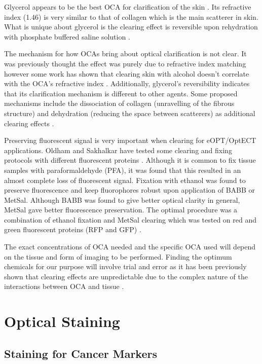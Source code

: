 	Glycerol appears to be the best OCA for clarification of the skin \cite{Vargas:1999, Wen:2009is}. Its refractive index (1.46) is very similar to that of collagen which is the main scatterer in skin. What is unique about glycerol is the clearing effect is reversible upon rehydration with phosphate buffered saline solution \cite{Vargas:1999}. 
	
	The mechanism for how OCAs bring about optical clarification is not clear. It was previously thought the effect was purely due to refractive index matching however some work has shown that clearing skin with alcohol doesn't correlate with the OCA's refractive index \cite{Choi:2005, Mao:2008}. Additionally, glycerol's reversibility indicates that its clarification mechanism is different to other agents. Some  proposed mechanisms include the dissociation of collagen (unravelling of the fibrous structure) and  dehydration (reducing the space between scatterers) as additional clearing effects \cite{Yeh:2003, Wen:2009is}.
	
	
	
	
	Preserving fluorescent signal is very important when clearing for eOPT/OptECT applications. Oldham and Sakhalkar have tested some clearing and fixing protocols with different fluorescent proteins \cite{Sakhalkar:2007hp, Oldham:2008dfa}. Although it is common to fix tissue samples with paraformaldehyde (PFA), it was found that this resulted in an almost complete loss of fluorescent signal. Fixation with ethanol was found to preserve fluorescence and keep fluorophores robust upon application of BABB or MetSal. Although BABB was found to give better optical clarity in general, MetSal gave better fluorescence preservation. The optimal procedure was a combination of ethanol fixation and MetSal clearing which was tested on red and green fluorescent proteins (RFP and GFP) \cite{Sakhalkar:2007hp}.
	
	
	The exact concentrations of OCA needed and the specific OCA used will depend on the tissue and form of imaging to be performed. Finding the optimum chemicals for our purpose will involve trial and error as it has been previously shown that clearing effects are unpredictable due to the complex nature of the interactions between OCA and tissue \cite{Wen:2009is}.
	
	
	
	\section{Optical Staining}
	\subsection*{Staining for Cancer Markers}
	
